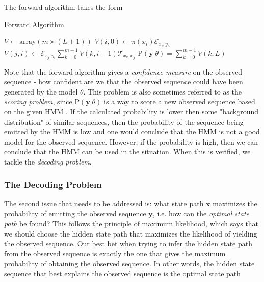 \documentclass{article}
\begin{document}
The forward algorithm takes the form 

\begin{algorithm}
    \caption{Forward Algorithm}\label{alg:Forward}
    \begin{algorithmic}
        \STATE $V \gets \text{array}(m \times (L+1))$
            \STATE $V(i,0) \gets \pi(x_i) \mathcal{E}_{x_i,y_0}$
        \ENDFOR
                \STATE $V(j,i) \gets \mathcal{E}_{x_j, y_i}\sum_{k=0}^{m-1}V(k, i-1)\mathcal{T}_{x_k,x_j} $
            \ENDFOR
        \ENDFOR
        \RETURN $\text{P}(\mathbf{y}|\theta) = \sum_{k=0}^{m-1}V(k,L)$
    \end{algorithmic} 
\end{algorithm}

Note that the forward algorithm gives a \textit{confidence measure} on the observed sequence - how confident are we that the observed sequence could have been generated by the model $\theta$. This problem is also sometimes referred to as the \textit{scoring problem}, since $\text{P}(\mathbf{y}|\theta)$ is a way to score a new observed sequence based on the given HMM \cite{Yoon2009}. If the calculated probability is lower then some "background distribution" of similar sequences, then the probability of the sequence being emitted by the HMM is low and one would conclude that the HMM is not a good model for the observed sequence. However, if the probability is high, then we can conclude that the HMM can be used in the situation. When this is verified, we tackle the \textit{decoding problem}.

\subsubsection{The Decoding Problem}
The second issue that needs to be addressed is: what state path $\mathbf{x}$ maximizes the probability of emitting the observed sequence $\mathbf{y}$, i.e. how can the \textit{optimal state path} be found? This follows the principle of maximum likelihood, which says that we should choose the hidden state path that maximizes the likelihood of yielding the observed sequence. Our best bet when trying to infer the hidden state path from the observed sequence is exactly the one that gives the maximum probability of obtaining the observed sequence. In other words, the hidden state sequence that best explains the observed sequence is the optimal state path
\end{document}
